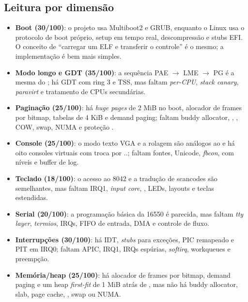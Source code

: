\subsection{Leitura por dimens\~ao}

\begin{itemize}
  \item \textbf{Boot (30/100)}: o projeto usa Multiboot2 e GRUB, enquanto o
        Linux usa o protocolo de boot pr\'oprio, setup em tempo real,
        descompress\~ao e stubs EFI. O conceito de ``carregar um ELF e
        transferir o controle'' \'e o mesmo; a implementa\c{c}\~ao \'e bem
        mais simples.
  \item \textbf{Modo longo e GDT (35/100)}: a sequ\^encia PAE $\rightarrow$
        LME $\rightarrow$ PG \'e a mesma do ; h\'a GDT com
        ring 3 e TSS, mas faltam \emph{per-CPU}, \emph{stack canary},
        \emph{paravirt} e tratamento de CPUs secund\'arias.
  \item \textbf{Pagina\c{c}\~ao (25/100)}: h\'a \emph{huge pages} de 2 MiB no
        boot, alocador de frames por bitmap, tabelas de 4 KiB e demand
        paging; faltam buddy allocator, , , COW,
        swap, NUMA e prote\c{c}\~ao .
  \item \textbf{Console (25/100)}: o modo texto VGA e a rolagem s\~ao
        an\'alogos ao  e h\'a oito consoles virtuais com troca
        por ..; faltam fontes, Unicode,
        \emph{fbcon},  com n\'iveis e buffer de log.
  \item \textbf{Teclado (18/100)}: o acesso ao 8042 e a tradu\c{c}\~ao de
        scancodes s\~ao semelhantes, mas faltam IRQ1, \emph{input core},
        , LEDs, layouts e teclas estendidas.
  \item \textbf{Serial (20/100)}: a programa\c{c}\~ao b\'asica da 16550 \'e
        parecida, mas faltam \emph{tty layer}, \emph{termios}, IRQs, FIFO
        de entrada, DMA e controle de fluxo.
  \item \textbf{Interrup\c{c}\~oes (30/100)}: h\'a IDT, \emph{stubs} para
        exce\c{c}\~oes, PIC remapeado e PIT em IRQ0; faltam APIC, IRQ1,
        IRQs esp\'urias, \emph{softirq}, workqueues e preemp\c{c}\~ao.
  \item \textbf{Mem\'oria/heap (25/100)}: h\'a alocador de frames por bitmap,
        demand paging e um heap \emph{first-fit} de 1 MiB atr\'as de
        , mas n\~ao h\'a buddy allocator, slab,
        page cache, , swap ou NUMA.

\end{itemize}
